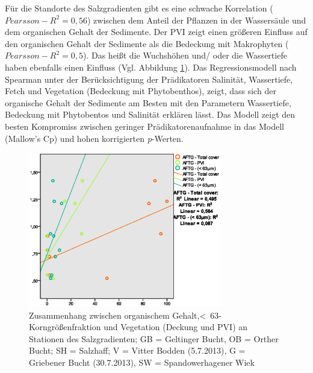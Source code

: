Für die Standorte des Salzgradienten gibt es eine schwache Korrelation ($ Pearsson-R^2 = 0,56 $) zwischen dem Anteil der Pflanzen in der Wassersäule und dem organischen Gehalt der Sedimente. Der PVI zeigt einen größeren Einfluss auf den organischen Gehalt der Sedimente als die Bedeckung mit Makrophyten ($Pearsson-R^2 = 0,5$). Das heißt die Wuchshöhen und/ oder die Wassertiefe haben ebenfalls einen Einfluss (Vgl. Abbildung \ref{fig:sg:afdg_regressionen}). 
Das Regressionsmodell nach Spearman unter der Berücksichtigung der Prädikatoren Salinität, Wassertiefe, Fetch und Vegetation (Bedeckung mit Phytobenthos), zeigt, dass sich der organische Gehalt der Sedimente am Besten mit den Parametern Wassertiefe, Bedeckung mit Phytobentos und Salinität erklären lässt. Das Modell zeigt den besten Kompromiss zwischen geringer Prädikatorenaufnahme in das Modell (Mallow's Cp) und hohen korrigierten \textit{p}-Werten.

\begin{figure}[!htb]
\centering
\includegraphics[width=0.75\textwidth]{images/salzsedimentauswertung/afdg1.eps}
\caption[Zusammenhang zwischen organischem Gehalt,\unit{<63}{\mu\metre}-Korngrößenfraktion und Vegetation]{Zusammenhang zwischen organischem Gehalt,\unit{<63}{\mu\metre}-Korngrößenfraktion und Vegetation (Deckung und PVI) an Stationen des Salzgradienten; GB = Geltinger Bucht, OB = Orther Bucht; SH = Salzhaff; V = Vitter Bodden (5.7.2013), G = Griebener Bucht (30.7.2013), SW = Spandowerhagener Wiek}
\label{fig:sg:afdg_regressionen}
\end{figure}

